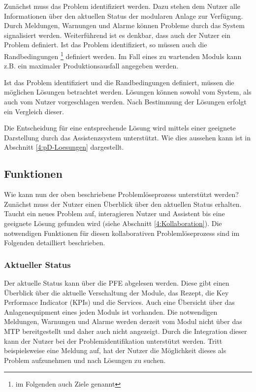 Zunächst muss das Problem identifiziert werden. Dazu stehen dem Nutzer alle Informationen über den aktuellen Status der modularen Anlage zur Verfügung. Durch Meldungen, Warnungen und Alarme können Probleme durch das System signalisiert werden. Weiterführend ist es denkbar, dass auch der Nutzer ein Problem definiert. Ist das Problem identifiziert, so müssen auch die Randbedingungen \footnote{im Folgenden auch Ziele genannt} definiert werden. Im Fall eines zu wartenden Moduls kann z.B. ein maximaler Produktionsausfall angegeben werden.

Ist das Problem identifiziert und die Randbedingungen definiert, müssen die möglichen Lösungen betrachtet werden. Lösungen können sowohl vom System, als auch vom Nutzer vorgeschlagen werden. Nach Bestimmung der Lösungen erfolgt ein Vergleich dieser.

Die Entscheidung für eine entsprechende Lösung wird mittels einer geeignete Darstellung durch das Assistenzsystem unterstützt. Wie dies aussehen kann ist in Abschnitt \ref{4:pD-Loesungen} dargestellt.

\subsection{Funktionen}
Wie kann nun der oben beschriebene Problemlöseprozess unterstützt werden? Zunächst muss der Nutzer einen Überblick über den aktuellen Status erhalten. Taucht ein neues Problem auf, interagieren Nutzer und Assistent bis eine geeignete Lösung gefunden wird (siehe Abschnitt \ref{4:Kollaboration}). Die notwendigen Funktionen für diesen kollaborativen Problemlöseprozess sind im Folgenden detailliert beschrieben.

\subsubsection*{Aktueller Status}
Der aktuelle Status kann über die PFE abgelesen werden. Diese gibt einen Überblick über die aktuelle Verschaltung der Module, das Rezept, die Key Performace Indicator (KPIs) und die Services. Auch eine Übersicht über das Anlagenequipment eines jeden Moduls ist vorhanden. Die notwendigen Meldungen, Warnungen und Alarme werden derzeit vom Modul nicht über das MTP bereitgestellt  und daher auch nicht angezeigt. Durch die Integration dieser kann der Nutzer bei der Problemidentifikation unterstützt werden. Tritt beispielsweise eine Meldung auf, hat der Nutzer die Möglichkeit dieses als Problem aufzunehmen und nach Lösungen zu suchen.

